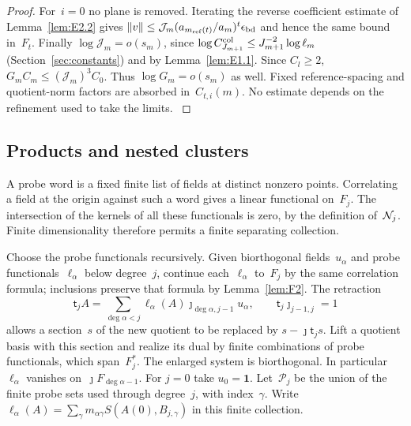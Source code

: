\begin{proof}
For~$i=0$ no plane is removed. Iterating the reverse coefficient estimate of Lemma~\ref{lem:E2.2} gives $\|v\|\le \mathcal J_m(a_{m_{\mathrm{ref}}(t)}/a_m)^t\epsilon_{\rm bd}$ and hence the same bound in~$F_t$. Finally $\log \mathcal J_m=o(s_m)$, since $\log C^{\rm col}_{J_{m+1}}\le J_{m+1}^{-2}\log\ell_m$ (Section~\ref{sec:constants}) and by Lemma~\ref{lem:E1.1}. Since $C_l\ge2$, $G_mC_m\le (\mathcal J_m)^3C_0$. Thus $\log G_m=o(s_m)$ as well. Fixed reference-spacing and quotient-norm factors are absorbed in~$C_{t,i}(m)$. No estimate depends on the refinement used to take the limits.
\label{proof:J-graded-end}
\end{proof}


\subsection{Products and nested clusters}\label{sec:partII-J.1}

A probe word is a fixed finite list of fields at distinct nonzero points. Correlating a field at the origin against such a word gives a linear functional on~$F_j$. The intersection of the kernels of all these functionals is zero, by the definition of~$\mathcal{N}_{j}$. Finite dimensionality therefore permits a finite separating collection.

Choose the probe functionals recursively. Given biorthogonal fields~$u_\alpha$ and probe functionals~$\ell_\alpha$ below degree~$j$, continue each~$\ell_\alpha$ to~$F_j$ by the same correlation formula; inclusions preserve that formula by Lemma~\ref{lem:F2}. The retraction
\begin{equation*}
\mathsf t_jA=\sum_{\deg\alpha<j}\ell_\alpha(A)\jmath_{\deg\alpha,j-1}u_\alpha,
\qquad\mathsf t_j\jmath_{j-1,j}=1
\end{equation*}
allows a section~$s$ of the new quotient to be replaced by $s-\jmath\mathsf t_js$. Lift a quotient basis with this section and realize its dual by finite combinations of probe functionals, which span~$F_j^*$. The enlarged system is biorthogonal. In particular~$\ell_\alpha$ vanishes on~$\jmath F_{\deg\alpha-1}$. For $j=0$ take $u_0=\mathbf1$. Let~$\mathcal P_j$ be the union of the finite probe sets used through degree~$j$, with index~$\gamma$. Write $\ell_\alpha(A)=\sum_\gamma m_{\alpha\gamma}S(A(0),B_{j,\gamma})$ in this finite collection.

